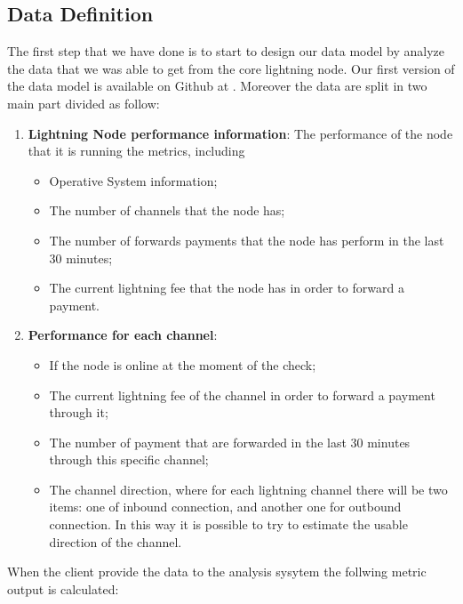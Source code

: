 \subsection{Data Definition}
\label{sec:data_definition_datadef}

The first step that we have done is to start to design our data model by analyze
the data that we was able to get from the core lightning node. Our first version
of the data model is available on Github at \cite{lnmetrics_localreputation}. 
Moreover the data are split in two main part divided as follow:

\begin{enumerate}
    \item {\bf Lightning Node performance information}: The performance of the node that it is running
        the metrics, including
        \begin{itemize}
           \item Operative System information;
           \item The number of channels that the node has;
           \item The number of forwards payments that the node has perform in the 
               last 30 minutes;
           \item The current lightning fee that the node has in order to 
               forward a payment.
        \end{itemize}
    \item {\bf Performance for each channel}:
    \begin{itemize}
        \item If the node is online at the moment of the check;
        \item The current lightning fee of the channel in order to forward a payment through it;
        \item The number of payment that are forwarded in the last 30 minutes through this specific 
            channel;
        \item The channel direction, where for each lightning channel there will be two items: one of 
            inbound connection, and another one for outbound connection. In this way it is possible to 
            try to estimate the usable direction of the channel.
    \end{itemize}
\end{enumerate}

When the client provide the data to the analysis sysytem the follwing metric output is calculated:

